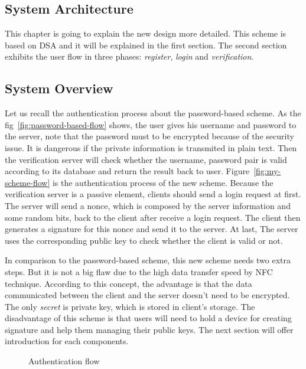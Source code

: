 \begin{CJK}{Bg5}{bsmi}


\chapter{System Architecture}

This chapter is going to explain the new design more detailed. This scheme is based on DSA and it will be explained in the first section. The second section exhibits the user flow in three phases: \emph{register}, \emph{login} and \emph{verification}.

\section{System Overview}

Let us recall the authentication process about the password-based scheme. As the fig~\ref{fig:password-based-flow} shows, the user gives his username and password to the server, note that the password must to be encrypted because of the security issue. It is dangerous if the private information is transmited in plain text. Then the verification server will check whether the username, password pair is valid according to its database and return the result back to user. Figure~\ref{fig:my-scheme-flow} is the authentication process of the new scheme. Because the verification server is a passive element, clients should send a login request at first. The server will send a nonce, which is composed by the server information and some random bits, back to the client after receive a login request. The client then generates a signature for this nonce and send it to the server. At last, The server uses the corresponding public key to check whether the client is valid or not.

In comparison to the password-based scheme, this new scheme needs two extra steps. But it is not a big flaw due to the high data transfer speed by NFC technique. According to this concept, the advantage is that the data communicated between the client and the server doesn't need to be encrypted. The only \emph{secret} is private key, which is stored in client's storage. The disadvantage of this scheme is that users will need to hold a device for creating signature and help them managing their public keys. The next section will offer introduction for each components.
\begin{figure}
\centering
{}
\caption{Authentication flow}
\end{figure}


\end{CJK}
